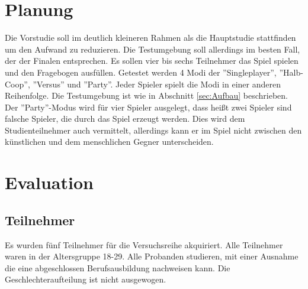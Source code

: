 \section{Planung}
Die Vorstudie soll im deutlich kleineren Rahmen als die Hauptstudie stattfinden um den Aufwand zu reduzieren. Die Testumgebung soll allerdings im besten Fall, der der Finalen  entsprechen. Es sollen vier bis sechs Teilnehmer das Spiel spielen und den Fragebogen ausfüllen. Getestet werden 4 Modi der ''Singleplayer'', ''Halb-Coop'', ''Versus'' und ''Party''. Jeder Spieler spielt die Modi in einer anderen Reihenfolge. Die Testumgebung ist wie in Abschnitt \ref{sec:Aufbau} beschrieben. Der ''Party''-Modus wird für vier Spieler ausgelegt, dass heißt zwei Spieler sind falsche Spieler, die durch das Spiel erzeugt werden. Dies wird dem Studienteilnehmer auch vermittelt, allerdings kann er im Spiel nicht zwischen den künstlichen und dem menschlichen Gegner unterscheiden.
\section{Evaluation}
\subsection{Teilnehmer}
Es wurden fünf Teilnehmer für die Versuchsreihe akquiriert. Alle Teilnehmer waren  in der Altersgruppe 18-29. Alle Probanden studieren, mit einer Ausnahme die eine abgeschlossen Berufsausbildung nachweisen kann. Die Geschlechteraufteilung ist nicht ausgewogen.
